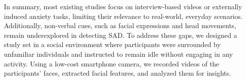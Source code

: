 In summary, most existing studies focus on interview-based videos or externally induced anxiety tasks, limiting their relevance to real-world, everyday scenarios. Additionally, non-verbal cues, such as facial expressions and head movements, remain underexplored in detecting SAD. To address these gaps, we designed a study set in a social environment where participants were surrounded by unfamiliar individuals and instructed to remain idle without engaging in any activity. Using a low-cost smartphone camera, we recorded videos of the participants' faces, extracted facial features, and analyzed them for insights.